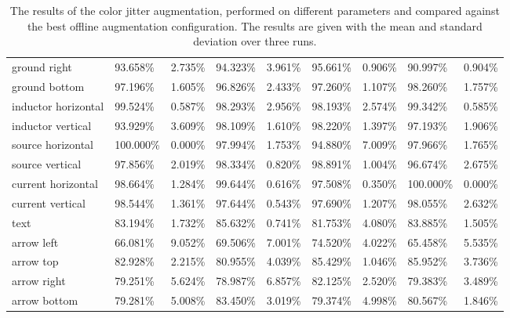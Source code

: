 \begin{table}[H]
\begin{center}
\begin{tabular}{|l|l|l|l|l|l|l|l|l|}
\rowcolor{lightgray!50}
ground right                    & 93.658\%  & 2.735\% & 94.323\%  & 3.961\% & 95.661\% & 0.906\%  & 90.997\%  & 0.904\%   \\
ground bottom                   & 97.196\%  & 1.605\% & 96.826\%  & 2.433\% & 97.260\% & 1.107\%  & 98.260\%  & 1.757\%   \\
\rowcolor{lightgray!50}
inductor horizontal             & 99.524\%  & 0.587\% & 98.293\%  & 2.956\% & 98.193\% & 2.574\%  & 99.342\%  & 0.585\%   \\
inductor vertical               & 93.929\%  & 3.609\% & 98.109\%  & 1.610\% & 98.220\% & 1.397\%  & 97.193\%  & 1.906\%   \\
\rowcolor{lightgray!50}
source horizontal               & 100.000\% & 0.000\% & 97.994\%  & 1.753\% & 94.880\% & 7.009\%  & 97.966\%  & 1.765\%   \\
source vertical                 & 97.856\%  & 2.019\% & 98.334\%  & 0.820\% & 98.891\% & 1.004\%  & 96.674\%  & 2.675\%   \\
\rowcolor{lightgray!50}
current horizontal              & 98.664\%  & 1.284\% & 99.644\%  & 0.616\% & 97.508\% & 0.350\%  & 100.000\% & 0.000\%   \\
current vertical                & 98.544\%  & 1.361\% & 97.644\%  & 0.543\% & 97.690\% & 1.207\%  & 98.055\%  & 2.632\%   \\
\rowcolor{lightgray!50}
text                            & 83.194\%  & 1.732\% & 85.632\%  & 0.741\% & 81.753\% & 4.080\%  & 83.885\%  & 1.505\%   \\
arrow left                      & 66.081\%  & 9.052\% & 69.506\%  & 7.001\% & 74.520\% & 4.022\%  & 65.458\%  & 5.535\%   \\
\rowcolor{lightgray!50}
arrow top                       & 82.928\%  & 2.215\% & 80.955\%  & 4.039\% & 85.429\% & 1.046\%  & 85.952\%  & 3.736\%   \\
arrow right                     & 79.251\%  & 5.624\% & 78.987\%  & 6.857\% & 82.125\% & 2.520\%  & 79.383\%  & 3.489\%   \\
\rowcolor{lightgray!50}
arrow bottom                    & 79.281\%  & 5.008\% & 83.450\%  & 3.019\% & 79.374\% & 4.998\%  & 80.567\%  & 1.846\%   \\
\hline

\end{tabular}
\caption{The results of the color jitter augmentation, performed on different parameters and compared against the best offline augmentation configuration. The results are given with the mean and standard deviation over three runs.}
\label{tab:yolo_color_jitter_augmentation_result}
\end{center}
\end{table}


